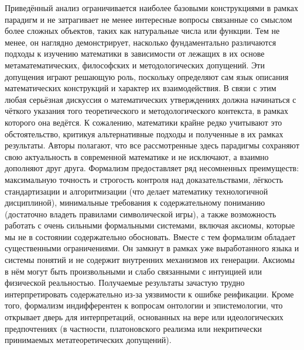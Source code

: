\documentclass[12pt]{article}
\begin{document}
Приведённый анализ ограничивается наиболее базовыми конструкциями в рамках парадигм и не затрагивает не менее интересные вопросы связанные со смыслом более сложных объектов, таких как натуральные числа или функции. Тем не менее, он наглядно демонстрирует, насколько фундаментально различаются подходы к изучению математики в зависимости от лежащих в их основе метаматематических, философских и методологических допущений. Эти допущения играют решающую роль, поскольку определяют сам язык описания математических конструкций и характер их взаимодействия. В связи с этим любая серьёзная дискуссия о математических утверждениях должна начинаться с чёткого указания того теоретического и методологического контекста, в рамках которого она ведётся. К сожалению, математики крайне редко учитывают это обстоятельство, критикуя альтернативные подходы и полученные в их рамках результаты. Авторы полагают, что все рассмотренные здесь парадигмы сохраняют свою актуальность в современной математике и не исключают, а взаимно дополняют друг друга. Формализм предоставляет ряд несомненных преимуществ: максимальную точность и строгость контроля над доказательствами, лёгкость стандартизации и алгоритмизации (что делает математику технологичной дисциплиной), минимальные требования к содержательному пониманию (достаточно владеть правилами символической игры), а также возможность работать с очень сильными формальными системами, включая аксиомы, которые мы не в состоянии содержательно обосновать. Вместе с тем формализм обладает существенными ограничениями. Он замкнут в рамках уже выработанного языка и системы понятий и не содержит внутренних механизмов их генерации. Аксиомы в нём могут быть произвольными и слабо связанными с интуицией или физической реальностью. Получаемые результаты зачастую трудно интерпретировать содержательно из-за уязвимости к ошибке реификации. Кроме того, формализм индифферентен к вопросам онтологии и эпистемологии, что открывает дверь для интерпретаций, основанных на вере или идеологических предпочтениях (в частности, платоновского реализма или некритически принимаемых метатеоретических допущений). 
\end{document}
